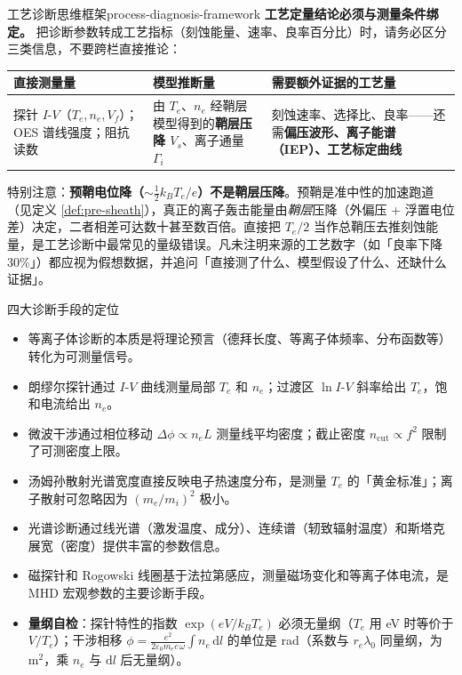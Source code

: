 \documentclass[12pt,a4paper,openany,oneside]{book}
\begin{document}
\begin{insight}{工艺诊断思维框架}{process-diagnosis-framework}
\textbf{工艺定量结论必须与测量条件绑定。} 把诊断参数转成工艺指标（刻蚀能量、速率、良率百分比）时，请务必区分三类信息，不要跨栏直接推论：
\begin{center}
\setlength{\tabcolsep}{4pt}
\begin{tabular}{@{}p{3.2cm}p{3.6cm}p{4.4cm}@{}}
\toprule
\textbf{直接测量量} & \textbf{模型推断量} & \textbf{需要额外证据的工艺量} \\
\midrule
探针 $I$-$V$（$T_e,n_e,V_f$）；OES 谱线强度；阻抗读数 & 由 $T_e$、$n_e$ 经鞘层模型得到的\textbf{鞘层压降 $V_s$}、离子通量 $\Gamma_i$ & 刻蚀速率、选择比、良率——还需\textbf{偏压波形、离子能谱（IEP）、工艺标定曲线} \\
\bottomrule
\end{tabular}
\end{center}
特别注意：\textbf{预鞘电位降（$\sim\frac12 k_BT_e/e$）不是鞘层压降}。预鞘是准中性的加速跑道（见定义 \ref{def:pre-sheath}），真正的离子轰击能量由\emph{鞘层}压降（外偏压 + 浮置电位差）决定，二者相差可达数十甚至数百倍。直接把 $T_e/2$ 当作总鞘压去推刻蚀能量，是工艺诊断中最常见的量级错误。凡未注明来源的工艺数字（如「良率下降 30\%」）都应视为假想数据，并追问「直接测了什么、模型假设了什么、还缺什么证据」。
\end{insight}

\begin{review}{四大诊断手段的定位}{}
\begin{itemize}
    \item 等离子体诊断的本质是将理论预言（德拜长度、等离子体频率、分布函数等）转化为可测量信号。
    \item 朗缪尔探针通过 $I$-$V$ 曲线测量局部 $T_e$ 和 $n_e$；过渡区 $\ln I$-$V$ 斜率给出 $T_e$，饱和电流给出 $n_e$。
    \item 微波干涉通过相位移动 $\Delta\phi \propto n_e L$ 测量线平均密度；截止密度 $n_{\mathrm{cut}} \propto f^2$ 限制了可测密度上限。
    \item 汤姆孙散射光谱宽度直接反映电子热速度分布，是测量 $T_e$ 的「黄金标准」；离子散射可忽略因为 $(m_e/m_i)^2$ 极小。
    \item 光谱诊断通过线光谱（激发温度、成分）、连续谱（轫致辐射温度）和斯塔克展宽（密度）提供丰富的参数信息。
    \item 磁探针和 Rogowski 线圈基于法拉第感应，测量磁场变化和等离子体电流，是 MHD 宏观参数的主要诊断手段。
\item \textbf{量纲自检}：探针特性的指数 $\exp(eV/k_BT_e)$ 必须无量纲（$T_e$ 用 eV 时等价于 $V/T_e$）；干涉相移 $\phi=\frac{e^2}{2\varepsilon_0m_ec\,\omega}\int n_e\,\mathrm{d}l$ 的单位是 rad（系数与 $r_e\lambda_0$ 同量纲，为 $\mathrm{m^2}$，乘 $n_e$ 与 $\mathrm{d}l$ 后无量纲）。
\end{itemize}
\end{review}
\end{document}
